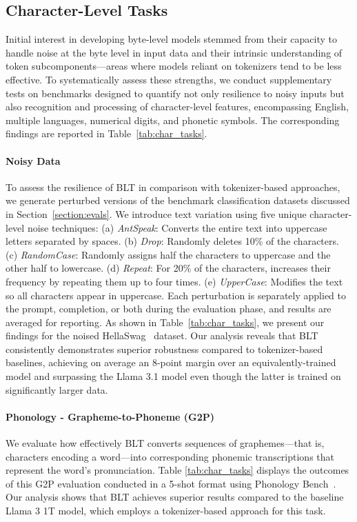 \subsection{Character-Level Tasks}

Initial interest in developing byte-level models stemmed from their capacity to handle noise at the byte level in input data and their intrinsic understanding of token subcomponents—areas where models reliant on tokenizers tend to be less effective. To systematically assess these strengths, we conduct supplementary tests on benchmarks designed to quantify not only resilience to noisy inputs but also recognition and processing of character-level features, encompassing English, multiple languages, numerical digits, and phonetic symbols. The corresponding findings are reported in Table~\ref{tab:char_tasks}.

\paragraph{Noisy Data} To assess the resilience of {\textsc BLT} in comparison with tokenizer-based approaches, we generate perturbed versions of the benchmark classification datasets discussed in Section~\ref{section:evals}. We introduce text variation using five unique character-level noise techniques: (a) \textit{AntSpeak}: Converts the entire text into uppercase letters separated by spaces. (b) \textit{Drop}: Randomly deletes 10\% of the characters. (c) \textit{RandomCase}: Randomly assigns half the characters to uppercase and the other half to lowercase. (d) \textit{Repeat}: For 20\% of the characters, increases their frequency by repeating them up to four times. (e) \textit{UpperCase}: Modifies the text so all characters appear in uppercase. Each perturbation is separately applied to the prompt, completion, or both during the evaluation phase, and results are averaged for reporting. As shown in Table~\ref{tab:char_tasks}, we present our findings for the noised HellaSwag~\citep{Eval_hellaswag} dataset. Our analysis reveals that {\textsc BLT} consistently demonstrates superior robustness compared to tokenizer-based baselines, achieving on average an 8-point margin over an equivalently-trained model and surpassing the Llama 3.1 model even though the latter is trained on significantly larger data.

\paragraph{Phonology - Grapheme-to-Phoneme (G2P)} We evaluate how effectively {\textsc BLT} converts sequences of graphemes—that is, characters encoding a word—into corresponding phonemic transcriptions that represent the word’s pronunciation. Table \ref{tab:char_tasks} displays the outcomes of this G2P evaluation conducted in a 5-shot format using Phonology Bench~\citep{suvarna2024phonologybench}. Our analysis shows that {\textsc BLT} achieves superior results compared to the baseline Llama 3 1T model, which employs a tokenizer-based approach for this task.

